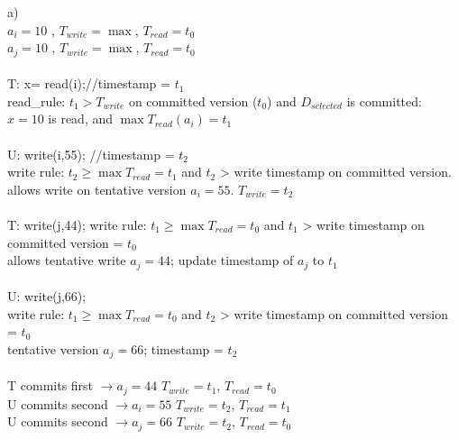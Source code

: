 \documentclass{article}
\begin{document}
\begin{enumerate}a)\\
        $a_i = 10$ , $T_{write} = \max$, $T_{read} = t_0$\\
        $a_j = 10$ , $T_{write} = \max$, $T_{read} = t_0$\\
        \\
        T: x= read(i);//timestamp = $t_1$\\
        read_rule: $t_1 > T_{write}$ on committed version ($t_0$) and $D_{selected}$ is committed:\\
        $x = 10$ is read, and $\max T_{read} (a_i) = t_1$\\
        \\
        U: write(i,55); //timestamp = $t_2$\\
        write rule: $t_2 \geq \max T_{read} = t_1$ and $t_2$ > write timestamp on committed version.\\
        allows write on tentative version $a_i = 55$. $T_{write} = t_2$\\
        \\
        T: write(j,44);
        write rule: $t_1 \geq \max T_{read} = t_0$ and $t_1$ > write timestamp on committed version = $t_0$\\
        allows tentative write $a_j = 44$; update timestamp of $a_j$ to $t_1$\\
        \\
        U: write(j,66);\\
        write rule: $t_1 \geq \max T_{read} = t_0$ and $t_2$ > write timestamp on committed version = $t_0$\\
        tentative version $a_j = 66$; timestamp = $t_2$\\
        \\
        T commits first $\rightarrow a_j = 44$ $T_{write} = t_1$, $T_{read} = t_0$\\
        U commits second $\rightarrow a_i = 55$ $T_{write} = t_2$, $T_{read} = t_1$\\
        U commits second $\rightarrow a_j = 66$ $T_{write} = t_2$, $T_{read} = t_0$
    \end{enumerate}
\end{document}
